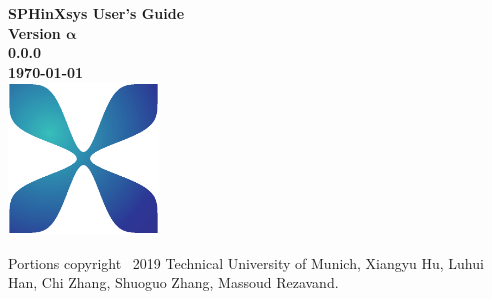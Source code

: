 \documentclass[12pt, a4paper,onecolumn]{article}
\begin{document}
\begin{titlepage}
	\centering
	\vfill
	{\bfseries\Huge
		SPHinXsys User's Guide \\
		\vskip2cm
	}
	{\bfseries\Large
	Version $\boldsymbol{\alpha}$\\
	}
	{
		\bfseries\normalsize
		0.0.0\\
		\vskip1cm
		\today\\
	}    
	\vfill
	\includegraphics[width=4cm]{figs/logo.eps} %
	\vfill
	\vfill
\end{titlepage}

\clearpage

\vspace*{\fill}
%
\begin{figure}
	\vspace*{-12pt}
	\vspace*{-12pt}
\end{figure}
%
\noindent Portions copyright \textcopyright\ 2019 Technical University of Munich, Xiangyu Hu, Luhui Han, Chi Zhang, Shuoguo Zhang, Massoud Rezavand.
\end{document}
